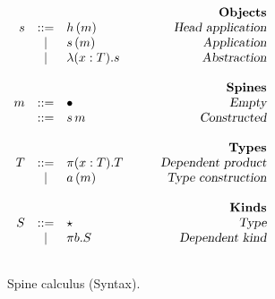 \begin{figure}
\begin{center}
\begin{math}
\begin{array}{rclr}
&&&\qquad\textsl{\bf Objects}\\
s

&::=& 
h\,(m) 
& \qquad\textsl{Head application}
\\
&|& 
s\,(m) 
& \qquad\textsl{Application}
\\

&|&
\lambda (x : T). s
& \qquad\textsl{Abstraction}
\\
\\
&&&\qquad\textsl{\bf Spines}\\
m

&::=&
\bullet
& \qquad\textsl{Empty}
\\
&::=&
s\,m
& \qquad\textsl{Constructed}
\\
\\
&&&\qquad\textsl{\bf Types}\\
T

&::=&
\pi (x : T). T
& \qquad\textsl{Dependent product}
\\

&|&
a\,(m)
& \qquad\textsl{Type construction}
\\
\\
&&&\qquad\textsl{\bf Kinds}\\
S

&::=&
\star
& \qquad\textsl{Type}
\\

&|&
\pi b. S
& \qquad\textsl{Dependent kind}
\\
\\

\end{array}
\end{math}
\end{center}
\caption{Spine calculus (Syntax).}
\label{fig:syntax-s2}
\end{figure}
